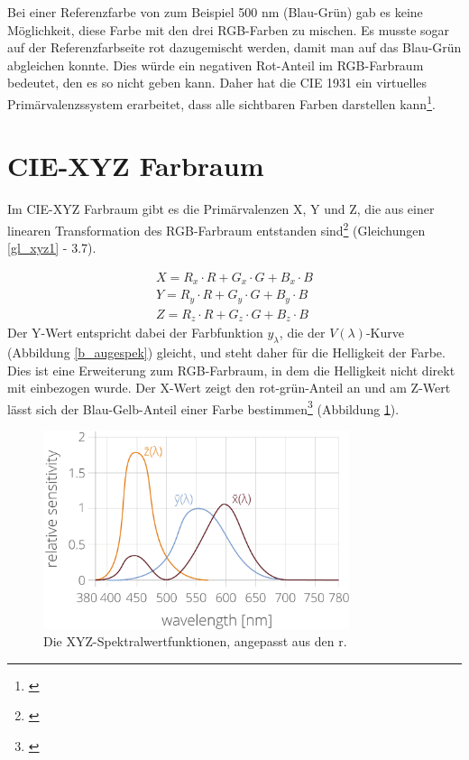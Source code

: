 \noindent Bei einer Referenzfarbe von zum Beispiel 500 nm (Blau-Grün) gab es keine Möglichkeit, diese Farbe mit den drei RGB-Farben zu mischen. Es musste sogar auf der Referenzfarbseite rot dazugemischt werden, damit man auf das Blau-Grün abgleichen konnte. Dies würde ein negativen Rot-Anteil im RGB-Farbraum bedeutet, den es so nicht geben kann. Daher hat die CIE 1931 ein virtuelles Primärvalenzssystem erarbeitet, dass alle sichtbaren Farben darstellen kann\footnote{\cite[77]{greule}}.\\

\section{CIE-XYZ Farbraum} \label{sec_xyz}
Im CIE-XYZ Farbraum gibt es die Primärvalenzen X, Y und Z, die aus einer linearen Transformation des RGB-Farbraum entstanden sind\footnote{\cite[76-77]{greule}} (Gleichungen  \ref{gl_xyz1} - 3.7).

\begin{eqnarray}\label{gl_xyz1}
		X = R_{x}\cdot R + G_{x}\cdot G + B_{x}\cdot B\\
		Y = R_{y}\cdot R + G_{y}\cdot G + B_{y}\cdot B\\
		Z = R_{z}\cdot R + G_{z}\cdot G + B_{z}\cdot B
\end{eqnarray}
Der Y-Wert entspricht dabei der Farbfunktion $y_{\lambda}$, die der $V(\lambda)$-Kurve (Abbildung \ref{b_augespek}) gleicht, und steht daher für die Helligkeit der Farbe. Dies ist eine Erweiterung zum RGB-Farbraum, in dem die Helligkeit nicht direkt mit einbezogen wurde. Der X-Wert zeigt den rot-grün-Anteil an und am Z-Wert lässt sich der Blau-Gelb-Anteil einer Farbe bestimmen\footnote{\cite[72]{mueller}} (Abbildung \ref{b_xyz2}).

\begin{figure}[H]     %
\centering
\includegraphics[width=0.8\textwidth]{bilder/xyz2} 
\caption {Die XYZ-Spektralwertfunktionen, angepasst aus den r.\protect\footnotemark}\label{b_xyz2}
\end{figure}
 
